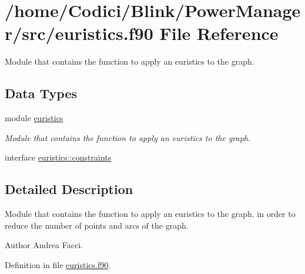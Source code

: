 \hypertarget{euristics_8f90}{\section{/home/\-Codici/\-Blink/\-Power\-Manager/src/euristics.f90 File Reference}
\label{euristics_8f90}
}


Module that contains the function to apply an euristics to the graph.  


\subsection*{Data Types}
\begin{DoxyCompactItemize}
\item 
module \hyperlink{classeuristics}{euristics}
\begin{DoxyCompactList}\small\item\em Module that contains the function to apply an euristics to the graph. \end{DoxyCompactList}\item 
interface \hyperlink{interfaceeuristics_1_1constraints}{euristics\-::constraints}
\end{DoxyCompactItemize}


\subsection{Detailed Description}
Module that contains the function to apply an euristics to the graph. in order to reduce the number of points and arcs of the graph. \begin{DoxyAuthor}{Author}
Andrea Facci. 
\end{DoxyAuthor}


Definition in file \hyperlink{euristics_8f90_source}{euristics.\-f90}.

